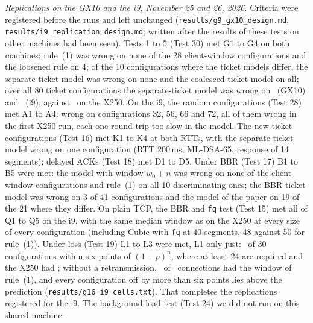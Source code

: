 \documentclass[9pt]{article}
\newcommand{\ms}{\,ms\xspace}
\begin{document}
\emph{Replications on the GX10 and the i9, November 25 and 26, 2026.} Criteria were registered before the runs and left unchanged (\texttt{results/g9\_gx10\_design.md}, \texttt{results/i9\_replication\_design.md}; written after the results of these tests on other machines had been seen). Tests 1 to 5 (Test 30) met G1 to G4 on both machines: rule~(1) was wrong on none of the 28 client-window configurations and the loosened rule on 4; of the 10 configurations where the ticket models differ, the separate-ticket model was wrong on none and the coalesced-ticket model on all; over all 80 ticket configurations the separate-ticket model was wrong on \RoneGxEarly\ (GX10) and \RoneIEarly\ (i9), against \RoneXEarly\ on the X250. On the i9, the random configurations (Test 28) met A1 to A4: wrong on configurations 32, 56, 66 and 72, all of them wrong in the first X250 run, each one round trip too slow in the model. The new ticket configurations (Test 16) met K1 to K4 at both RTTs, with the separate-ticket model wrong on one configuration (RTT 200\ms, ML-DSA-65, response of 14 segments); delayed ACKs (Test 18) met D1 to D5. Under BBR (Test 17) B1 to B5 were met: the model with window $w_0+n$ was wrong on none of the client-window configurations and rule~(1) on all 10 discriminating ones; the BBR ticket model was wrong on 3 of 41 configurations and the model of the paper on 19 of the 21 where they differ. On plain TCP, the BBR and \texttt{fq} test (Test 15) met all of Q1 to Q5 on the i9, with the same median window as on the X250 at every size of every configuration (including Cubic with \texttt{fq} at 40 segments, 48 against 50 for rule~(1)). Under loss (Test 19) L1 to L3 were met, L1 only just: \GsixIWithin\ of 30 configurations within six points of $(1-p)^n$, where at least 24 are required and the X250 had \GsixWithin; without a retransmission, \GsixINoRetxOk\ of \GsixINoRetxN\ connections had the window of rule~(1), and every configuration off by more than six points lies above the prediction (\texttt{results/g16\_i9\_cells.txt}). That completes the replications registered for the i9. The background-load test (Test 24) we did not run on this shared machine.
\end{document}
